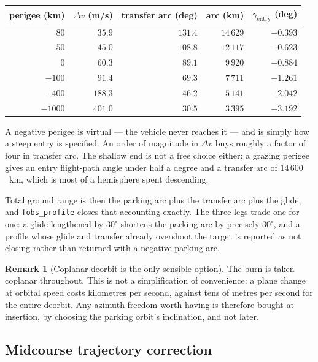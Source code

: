 \documentclass[11pt,a4paper]{article}
\theoremstyle{definition}
\newtheorem{remark}[theorem]{Remark}
\numberwithin{equation}{section}
\begin{document}
\begin{center}
\begin{tabular}{@{}rrrrr@{}}
\toprule
perigee (km) & $\Delta v$ (m/s) & transfer arc (deg) & arc (km) & $\gamma_{\text{entry}}$ (deg) \\
\midrule
$80$ & $35.9$ & $131.4$ & $14\,629$ & $-0.393$ \\
$50$ & $45.0$ & $108.8$ & $12\,117$ & $-0.623$ \\
$0$ & $60.3$ & $89.1$ & $9\,920$ & $-0.884$ \\
$-100$ & $91.4$ & $69.3$ & $7\,711$ & $-1.261$ \\
$-400$ & $188.3$ & $46.2$ & $5\,141$ & $-2.042$ \\
$-1000$ & $401.0$ & $30.5$ & $3\,395$ & $-3.192$ \\
\bottomrule
\end{tabular}
\end{center}

A negative perigee is virtual --- the vehicle never reaches it --- and is simply how a steep entry is specified. An order of magnitude in $\Delta v$ buys roughly a factor of four in transfer arc. The shallow end is not a free choice either: a grazing perigee gives an entry flight-path angle under half a degree and a transfer arc of $14\,600$~km, which is most of a hemisphere spent descending.

Total ground range is then the parking arc plus the transfer arc plus the glide, and \texttt{fobs\_profile} closes that accounting exactly. The three legs trade one-for-one: a glide lengthened by $30^\circ$ shortens the parking arc by precisely $30^\circ$, and a profile whose glide and transfer already overshoot the target is reported as not closing rather than returned with a negative parking arc.

\begin{remark}[Coplanar deorbit is the only sensible option]
The burn is taken coplanar throughout. This is not a simplification of convenience: a plane change at orbital speed costs kilometres per second, against tens of metres per second for the entire deorbit. Any azimuth freedom worth having is therefore bought at insertion, by choosing the parking orbit's inclination, and not later.
\end{remark}

\subsection{Midcourse trajectory correction}
\label{sec:midcourse}
\end{document}
